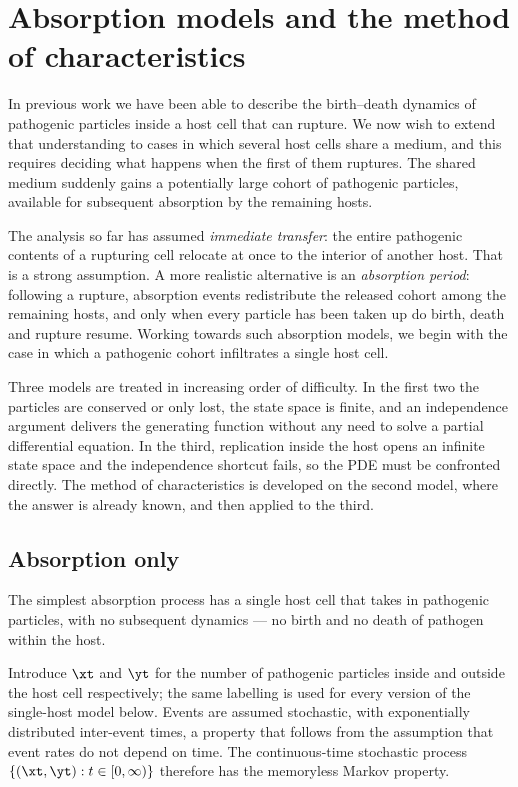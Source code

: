 \section{Absorption models and the method of characteristics}
\label{sec:moc}

In previous work we have been able to describe the birth--death dynamics of
pathogenic particles inside a host cell that can rupture. We now wish to extend that
understanding to cases in which several host cells share a medium, and this requires
deciding what happens when the first of them ruptures. The shared medium suddenly
gains a potentially large cohort of pathogenic particles, available for subsequent
absorption by the remaining hosts.

The analysis so far has assumed \emph{immediate transfer}: the entire pathogenic
contents of a rupturing cell relocate at once to the interior of another host. That
is a strong assumption. A more realistic alternative is an \emph{absorption period}:
following a rupture, absorption events redistribute the released cohort among the
remaining hosts, and only when every particle has been taken up do birth, death and
rupture resume. Working towards such absorption models, we begin with the case in
which a pathogenic cohort infiltrates a single host cell.

Three models are treated in increasing order of difficulty. In the first two the
particles are conserved or only lost, the state space is finite, and an independence
argument delivers the generating function without any need to solve a partial
differential equation. In the third, replication inside the host opens an infinite
state space and the independence shortcut fails, so the PDE must be confronted
directly. The method of characteristics is developed on the second model, where the
answer is already known, and then applied to the third.

\subsection{Absorption only}
\label{sec:absonly}

The simplest absorption process has a single host cell that takes in pathogenic
particles, with no subsequent dynamics --- no birth and no death of pathogen within
the host.

Introduce $\xt$ and $\yt$ for the number of pathogenic particles inside and outside
the host cell respectively; the same labelling is used for every version of the
single-host model below. Events are assumed stochastic, with exponentially
distributed inter-event times, a property that follows from the assumption that
event rates do not depend on time. The continuous-time stochastic process
$\{(\xt,\yt) : t\in[0,\infty)\}$ therefore has the memoryless Markov property.

